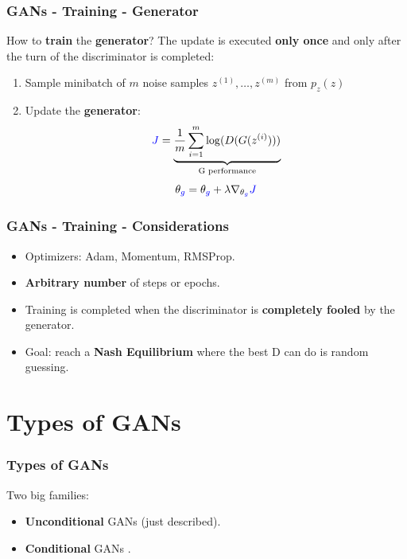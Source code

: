 \documentclass{beamer}
\begin{document}
\begin{frame}
	\frametitle{GANs - Training - Generator}
	How to \textbf{train} the \textbf{generator}? \newline
	The update is executed \textbf{only once} and only after the turn of the discriminator is completed:
	\begin{enumerate}
		\item<1-> \alert<+>{Sample minibatch of $m$ noise samples ${z^{(1)},\dots,z^{(m)}}$ from $p_z(z)$}
		\item<2-> \alert<+>{Update the \textbf{generator}:
			\begin{equation*}
			\textcolor{blue}{J} = \underbrace{\frac{1}{m} \sum_{i=1}^{m} \log(D(G(z^{(i)})))}_{\text{G performance}}
			\end{equation*}
			\LARGE
			\begin{equation*}
			\theta_{\textcolor{blue}{g}} = \theta_{\textcolor{blue}{g}}  + \lambda \nabla_{\theta_{\textcolor{blue}{g}}} \textcolor{blue}{J}
			\end{equation*}
}
	\end{enumerate}
\end{frame} 

\begin{frame}
	\frametitle{GANs - Training - Considerations}
	\begin{itemize}
		\item Optimizers: Adam, Momentum, RMSProp.
		\item \textbf{Arbitrary number} of steps or epochs.
		\item Training is completed when the discriminator is \textbf{completely fooled} by the generator.
		\item Goal: reach a \textbf{Nash Equilibrium} where the best D can do is random guessing.
	\end{itemize}
 \end{frame}
 
\section{Types of GANs}

\begin{frame}
	\frametitle{Types of GANs}
	Two big families:
	\begin{itemize}
		\item \textbf{Unconditional} GANs (just described).
		\item \textbf{Conditional} GANs \citep{mirzaConditionalGenerativeAdversarial2014}.
	\end{itemize}
\end{frame}
\end{document}
